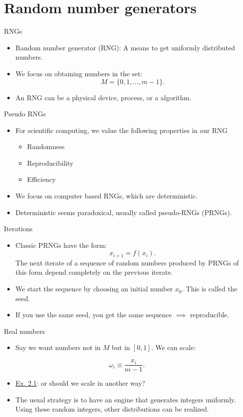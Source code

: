 \documentclass[10pt]{beamer}
\begin{document}
\section{Random number generators}
\label{sec:org2573c46}
\begin{frame}[label={sec:org39bf316}]{RNGs}
\begin{itemize}
\item Random number generator (RNG): \alert{A means to get uniformly distributed numbers.}
\item We focus on obtaining numbers in the set:
$$M = \{ 0, 1, \ldots, m - 1 \}.$$
\item An RNG can be a physical device, process, or a algorithm.
\end{itemize}
\end{frame}
\begin{frame}[label={sec:org8437069}]{Pseudo RNGs}
\begin{itemize}
\item For scientific computing, we value the following properties in our RNG
\begin{itemize}
\item \alert{Randomness}
\item \alert{Reproducibility}
\item \alert{Efficiency}
\end{itemize}
\item We focus on computer based RNGs, which are deterministic.
\item Deterministic seems paradoxical, usually called pseudo-RNGs (PRNGs).
\end{itemize}
\end{frame}
\begin{frame}[label={sec:org829aab9}]{Iterations}
\begin{itemize}
\item Classic PRNGs have the form:
$$x_{i + 1} = f(x_i).$$
The next iterate of a sequence of random numbers produced by PRNGs of this form depend completely on the previous iterate.
\item We start the sequence by choosing an initial number \(x_0\). This is called the \alert{seed}.
\item If you use the same seed, you get the same sequence \(\implies\) reproducible.
\end{itemize}
\end{frame}
\begin{frame}[label={sec:org8a657c7}]{Real numbers}
\begin{itemize}
\item Say we want numbers not in \(M\) but in \([0, 1]\). We can scale:
\end{itemize}
$$\omega_i \equiv \frac{x_i}{m - 1}.$$

\begin{itemize}
\item \uline{Ex. 2.1}: or should we scale in another way?
\item The usual strategy is to have an \alert{engine} that generates integers uniformly. Using these
random integers, other \alert{distributions} can be realized.
\end{itemize}
\end{frame}
\end{document}
